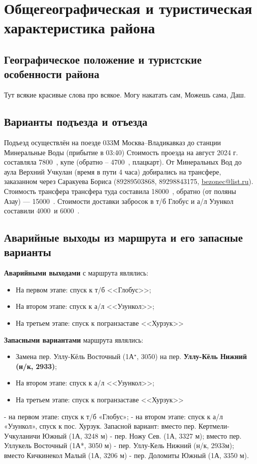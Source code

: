 \section{Общегеографическая и туристическая характеристика района}

\subsection{Географическое положение и туристские особенности района}
Тут всякие красивые слова про всякое. Могу накатать сам, Можешь  сама, Даш. 


\subsection{Варианты подъезда и отъезда}
Подъезд осуществлён на поезде 033М Москва--Владикавказ до станции Минеральные Воды (прибытие в 03:40) Стоимость проезда на август 2024 г. составляла 7800~\faRub, купе (обратно – 4700~\faRub, плацкарт). От Минеральных Вод до аула Верхний Учкулан (время в пути 4 часа) добирались на трансфере, заказанном через Саракуева Бориса (89289503868, 89298843175,  \href{mailto: bezonec@list.ru}{bezonec@list.ru}). Стоимость трансфера трансфера туда составила 18000~\faRub, обратно (от поляны Азау) — 15000~\faRub. Стоимости доставки забросок в т/б Глобус и а/л Узункол составили 4000~\faRub  и 6000~\faRub.

\subsection{Аварийные выходы из маршрута и его запасные варианты}
\textbf{Аварийными выходами} с маршрута являлись:
\begin{itemize}
	\item На первом этапе: спуск к т/б <<Глобус>>;
	\item На втором этапе: спуск к а/л <<Узункол>>;
	\item На третьем этапе: спуск к погранзаставе <<Хурзук>>
\end{itemize}


\textbf{Запасными вариантами} маршрута являлись:
\begin{itemize}
	\item Замена пер. Уллу-Кёль Восточный (1А$^\star$, 3050) на пер. \textbf{Уллу-Кёль Нижний (н/к, 2933)};
	\item На втором этапе: спуск к а/л <<Узункол>>;
	\item На третьем этапе: спуск к погранзаставе <<Хурзук>>
\end{itemize}
- на первом этапе: спуск к т/б «Глобус»;
- на втором этапе: спуск к а/л «Узункол», спуск к пос. Хурзук.
Запасной вариант: вместо пер. Кертмели-Учкуланичи Южный (1А, 3248 м) - пер. Ножу Сев. (1А, 3327 м); вместо пер. Уллукель Восточный (1А*, 3050 м) - пер. Уллу-Кель Нижний (н/к, 2933м); вместо Кичкинекол Малый (1А, 3206 м) - пер. Доломиты Южный (1А, 3350 м).

